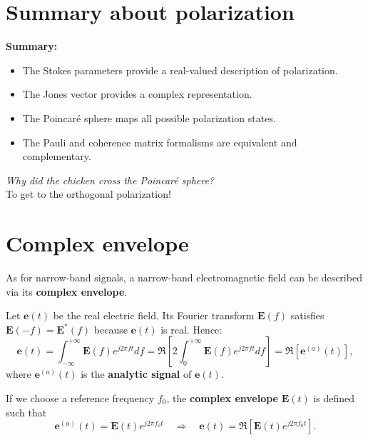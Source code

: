 \section{Summary about polarization}

\textbf{Summary:}
\begin{itemize}
    \item The Stokes parameters provide a real-valued description of polarization.
    \item The Jones vector provides a complex representation.
    \item The Poincaré sphere maps all possible polarization states.
    \item The Pauli and coherence matrix formalisms are equivalent and complementary.
\end{itemize}

\begin{center}
    \textit{Why did the chicken cross the Poincaré sphere?}\\[2pt]
    To get to the orthogonal polarization! 🐣
\end{center}

\section{Complex envelope}

As for narrow-band signals, a narrow-band electromagnetic field can be described via its \textbf{complex envelope}.

Let $\mathbf{e}(t)$ be the real electric field.  
Its Fourier transform $\mathbf{E}(f)$ satisfies $\mathbf{E}(-f) = \mathbf{E}^*(f)$ because $\mathbf{e}(t)$ is real.  
Hence:
\begin{equation}
    \mathbf{e}(t)
    = \int_{-\infty}^{+\infty} \mathbf{E}(f)e^{j2\pi f t}df
    = \Re\!\left[2\int_0^{+\infty}\mathbf{E}(f)e^{j2\pi f t}df\right]
    = \Re\!\left[\mathbf{e}^{(a)}(t)\right],
\end{equation}
where $\mathbf{e}^{(a)}(t)$ is the \textbf{analytic signal} of $\mathbf{e}(t)$.

If we choose a reference frequency $f_0$, the \textbf{complex envelope} $\mathbf{E}(t)$ is defined such that
\begin{equation}
    \mathbf{e}^{(a)}(t) = \mathbf{E}(t)e^{j2\pi f_0 t}
    \quad\Rightarrow\quad
    \mathbf{e}(t) = \Re\!\left[\mathbf{E}(t)e^{j2\pi f_0 t}\right].
\end{equation}

